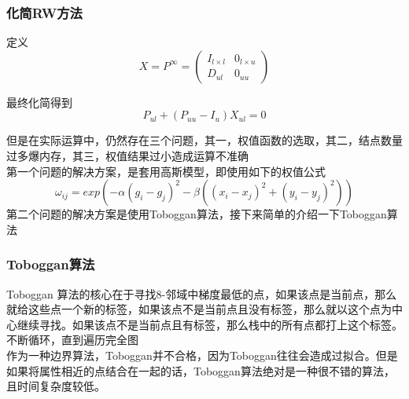 \documentclass[notheorems, UTF8]{ctexbeamer}
\begin{document}
\begin{frame}
\frametitle{化简RW方法}
定义
\begin{displaymath}
X = P^\infty =  \left(
\begin{array}{ll}
I_{l \times l}      & 0_{l \times u}\\
D_{ul} & 0_{uu}
\end{array}
\right) 
\end{displaymath}

最终化简得到
\begin{displaymath}
P_{ul} + (P_{uu}-I_u)X_{ul} = 0
\end{displaymath}

但是在实际运算中，仍然存在三个问题，其一，权值函数的选取，其二，结点数量过多爆内存，其三，权值结果过小造成运算不准确\\
第一个问题的解决方案，是套用高斯模型，即使用如下的权值公式
\begin{displaymath}
\omega_{ij} = exp(-\alpha(g_i - g_j)^2 -\beta((x_i-x_j)^2 + (y_i-y_j)^2 ))
\end{displaymath}
第二个问题的解决方案是使用Toboggan算法，接下来简单的介绍一下Toboggan算法
\end{frame}



\begin{frame}
\frametitle{Toboggan算法}
Toboggan 算法的核心在于寻找8-邻域中梯度最低的点，如果该点是当前点，那么就给这些点一个新的标签，如果该点不是当前点且没有标签，那么就以这个点为中心继续寻找。如果该点不是当前点且有标签，那么栈中的所有点都打上这个标签。不断循环，直到遍历完全图\\

作为一种边界算法，Toboggan并不合格，因为Toboggan往往会造成过拟合。但是如果将属性相近的点结合在一起的话，Toboggan算法绝对是一种很不错的算法，且时间复杂度较低。
\end{frame}
\end{document}

